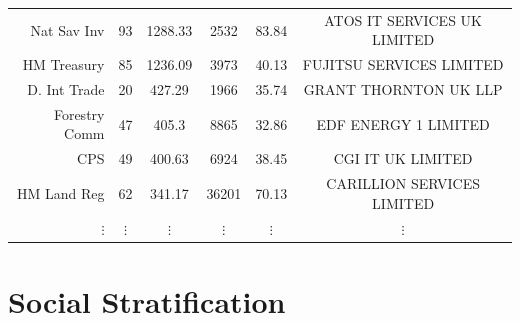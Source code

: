 \documentclass[11pt]{beamer}
\begin{document}
{\begin{table}[]
\begin{tabular}{rccccc}
Nat Sav Inv    & 93         & 1288.33        & 2532          & 83.84                     & ATOS IT SERVICES UK LIMITED        \\
HM Treasury    & 85         & 1236.09        & 3973          & 40.13                     & FUJITSU SERVICES LIMITED           \\
D. Int Trade   & 20         & 427.29         & 1966          & 35.74                     & GRANT THORNTON UK LLP              \\
Forestry Comm  & 47         & 405.3          & 8865          & 32.86                     & EDF ENERGY 1 LIMITED               \\
CPS            & 49         & 400.63         & 6924          & 38.45                     & CGI IT UK LIMITED                  \\
HM Land Reg    & 62         & 341.17         & 36201         & 70.13                     & CARILLION SERVICES LIMITED  \\
$\vdots$ & $\vdots$ & $\vdots$ & $\vdots$ & $\vdots$ & $\vdots$ \\ \bottomrule
\end{tabular}
\end{table}
}

\section{Social Stratification}
\end{document}
